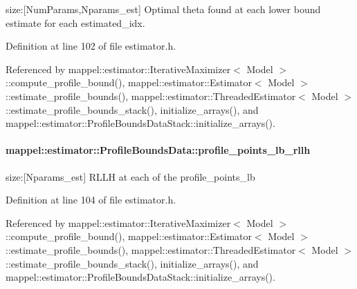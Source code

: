 size\+:\mbox{[}Num\+Params,Nparams\+\_\+est\mbox{]} Optimal theta found at each lower bound estimate for each estimated\+\_\+idx. 



Definition at line 102 of file estimator.\+h.



Referenced by mappel\+::estimator\+::\+Iterative\+Maximizer$<$ Model $>$\+::compute\+\_\+profile\+\_\+bound(), mappel\+::estimator\+::\+Estimator$<$ Model $>$\+::estimate\+\_\+profile\+\_\+bounds(), mappel\+::estimator\+::\+Threaded\+Estimator$<$ Model $>$\+::estimate\+\_\+profile\+\_\+bounds\+\_\+stack(), initialize\+\_\+arrays(), and mappel\+::estimator\+::\+Profile\+Bounds\+Data\+Stack\+::initialize\+\_\+arrays().

\paragraph[{\texorpdfstring{profile\+\_\+points\+\_\+lb\+\_\+rllh}{profile_points_lb_rllh}}]{ mappel\+::estimator\+::\+Profile\+Bounds\+Data\+::profile\+\_\+points\+\_\+lb\+\_\+rllh}\hypertarget{structmappel_1_1estimator_1_1ProfileBoundsData_a1b60b8277319ad91eeb193d76c40e8e2}{}\label{structmappel_1_1estimator_1_1ProfileBoundsData_a1b60b8277319ad91eeb193d76c40e8e2}


size\+:\mbox{[}Nparams\+\_\+est\mbox{]} R\+L\+LH at each of the profile\+\_\+points\+\_\+lb 



Definition at line 104 of file estimator.\+h.



Referenced by mappel\+::estimator\+::\+Iterative\+Maximizer$<$ Model $>$\+::compute\+\_\+profile\+\_\+bound(), mappel\+::estimator\+::\+Estimator$<$ Model $>$\+::estimate\+\_\+profile\+\_\+bounds(), mappel\+::estimator\+::\+Threaded\+Estimator$<$ Model $>$\+::estimate\+\_\+profile\+\_\+bounds\+\_\+stack(), initialize\+\_\+arrays(), and mappel\+::estimator\+::\+Profile\+Bounds\+Data\+Stack\+::initialize\+\_\+arrays().

